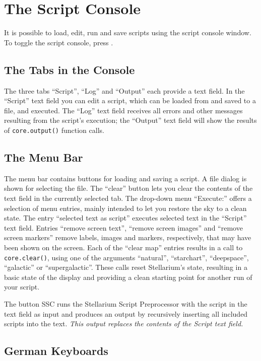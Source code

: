 \section{The Script Console}
\label{sec:scripting:console}
It is possible to load, edit, run and save scripts using the script
console window. To toggle the script console, press .  

\subsection{The Tabs in the Console}

The three tabs ``Script'', ``Log'' and ``Output'' each provide a text
field. In the ``Script'' text field you can edit a script,
which can be loaded from and saved to a file, and executed. The ``Log''
text field receives all errors and other messages resulting from the
script's execution; the ``Output'' text field will show the results of
\texttt{core.output()} function calls. 

\subsection{The Menu Bar}

The menu bar contains buttons for loading and saving a script. A file
dialog is shown for selecting the file. The ``clear'' button lets you
clear the contents of the text field in the currently selected tab.
The drop-down menu ``Execute:'' offers a selection of menu entries, mainly
intended to let you restore the sky to a clean state. The entry
``selected text as script'' executes selected text in the ``Script'' text
field. Entries ``remove screen text'', ``remove screen images'' and 
``remove screen markers'' remove labels, images and markers, respectively,
that may have been shown on the screen. Each of the ``clear map'' entries
results in a call to \texttt{core.clear()}, using one of the arguments
``natural'', ``starchart'', ``deepspace'', ``galactic'' or ``supergalactic''.
These calls reset Stellarium's state, resulting in a basic state
of the display and providing a clean starting point for another run of
your script.

The button SSC runs the Stellarium Script Preprocessor with the script in the text
field as input and produces an output by recursively inserting all
included scripts into the text.
\emph{This output replaces the contents of the Script text field.}

\subsection{German Keyboards}

